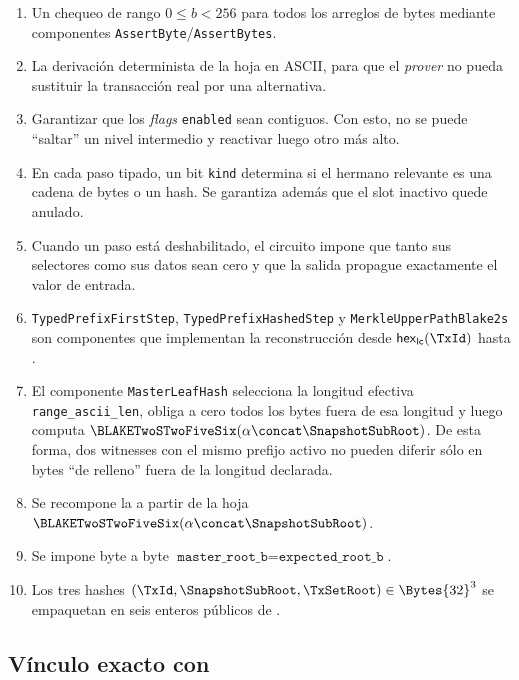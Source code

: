 \begin{enumerate}[noitemsep]
	\item Un chequeo de rango $0 \leq b < 256$ para todos los arreglos de bytes mediante componentes \texttt{AssertByte}/\texttt{AssertBytes}.
	\item La derivación determinista de la hoja en ASCII, para que el \textit{prover} no pueda sustituir la transacción real por una alternativa.
	\item Garantizar que los \textit{flags} \texttt{enabled} sean contiguos. Con esto, no se puede ``saltar'' un nivel intermedio y reactivar luego otro más alto.
	\item En cada paso tipado, un bit \texttt{kind} determina si el hermano relevante es una cadena de bytes o un hash. Se garantiza además que el slot inactivo quede anulado.
	\item Cuando un paso está deshabilitado, el circuito impone que tanto sus selectores como sus datos sean cero y que la salida propague exactamente el valor de entrada.
	\item \texttt{TypedPrefixFirstStep}, \texttt{TypedPrefixHashedStep} y \texttt{MerkleUpperPathBlake2s} son componentes que implementan la reconstrucción desde \(\mathsf{hex}_{\mathsf{lc}}(\TxId)\) hasta \SnapshotSubRoot.
	\item El componente \texttt{MasterLeafHash} selecciona la longitud efectiva \texttt{range\_ascii\_len}, obliga a cero todos los bytes fuera de esa longitud y luego computa $\BLAKETwoSTwoFiveSix(\alpha \concat \SnapshotSubRoot)$. De esta forma, dos witnesses con el mismo prefijo activo no pueden diferir sólo en bytes ``de relleno'' fuera de la longitud declarada.
	\item Se recompone la \TxSetRoot a partir de la hoja $\BLAKETwoSTwoFiveSix(\alpha \concat \SnapshotSubRoot)$.
	\item Se impone byte a byte $\texttt{master\_root\_b} = \texttt{expected\_root\_b}$.
	\item Los tres hashes $(\TxId, \SnapshotSubRoot, \TxSetRoot) \in \Bytes{32}^3$ se empaquetan en seis enteros públicos de .
\end{enumerate}

\subsection{Vínculo exacto con \MintingValidator}

